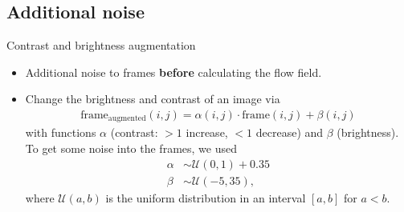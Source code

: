 
\subsection{Additional noise}
\begin{frame}{Contrast and brightness augmentation}
\begin{itemize}
\item Additional noise to frames \textbf{before} calculating the flow field.
\item Change the brightness and contrast of an image via
\begin{align*}
\text{frame}_{\mathrm{augmented}}(i,j) = \alpha(i,j) \cdot \text{frame}(i,j) + \beta(i,j)
\end{align*}
with functions $\alpha$ (contrast: $>1$ increase, $<1$ decrease) and $\beta$ (brightness).\\
To get some noise into the frames, we used
\begin{align*}
\alpha &\sim \mathcal{U}(0,1)+0.35\\
\beta &\sim \mathcal{U}(-5,35),
\end{align*}
where $\mathcal{U}(a,b)$ is the uniform distribution in an interval $[a,b]$ for $a < b$.
\end{itemize}
\end{frame}